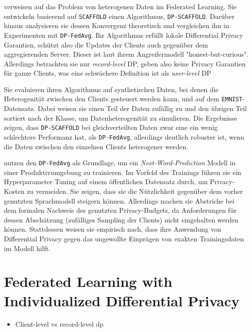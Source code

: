 \textcite{noble:2023} verweisen auf das Problem von heterogenen Daten im Federated Learning. Sie entwickeln basierend auf \texttt{SCAFFOLD} einen Algorithmus, \texttt{DP-SCAFFOLD}. Darüber hinaus analysieren sie dessen Konvergenz theoretisch und vergleichen ihn in Experimenten mit \texttt{DP-FedAvg}. Ihr Algorithmus erfüllt lokale Differential Privacy Garantien, schützt also die Updates der Clients auch gegenüber dem aggregierenden Server. Dieser ist laut ihrem Angreifermodell "honest-but-curious". Allerdings betrachten sie nur \textit{record-level} DP, geben also keine Privacy Garantien für ganze Clients, was eine schwächere Definition ist als \textit{user-level} DP\cite[p.44]{kairouz:2021}

Sie evaluieren ihren Algorithmus auf synthetischen Daten, bei denen die Heterogenität zwischen den Clients gesteuert werden kann, und auf dem \texttt{EMNIST}-Datensatz. Dabei weisen sie einen Teil der Daten zufällig zu und den übrigen Teil sortiert nach der Klasse, um Datenheterogenität zu simulieren. Die Ergebnisse zeigen, dass \texttt{DP-SCAFFOLD} bei gleichverteilten Daten zwar eine ein wenig schlechtere Performanz hat, als \texttt{DP-FedAvg}, allerdings deutlich robuster ist, wenn die Daten zwischen den einzelnen Clients heterogener werden.

\textcite{ramaswamy:2020} nutzen den \texttt{DP-FedAvg} als Grundlage, um ein \textit{Next-Word-Prediction} Modell in einer Produktivumgebung zu trainieren. Im Vorfeld des Trainings führen sie ein Hyperparameter Tuning auf einem öffentlichen Datensatz durch, um Privacy-Kosten zu vermeiden. Sie zeigen, dass sie die Nützlichkeit gegenüber dem vorher genutzten Sprachmodell steigern können. Allerdings machen sie Abstriche bei dem formalen Nachweis des genutzten Privacy-Budgets, da Anforderungen für dessen Abschätzung (zufälliges Sampling der Clients) nicht eingehalten werden können\cite{wang:2020}. Stattdessen weisen sie empirisch nach, dass ihre Anwendung von Differential Privacy gegen das ungewollte Einprägen von exakten Trainingsdaten im Modell hilft.


\section{Federated Learning with Individualized Differential Privacy}\label{sec:rw-flidp}

\begin{itemize}
	\item Client-level vs record-level dp
\end{itemize}

